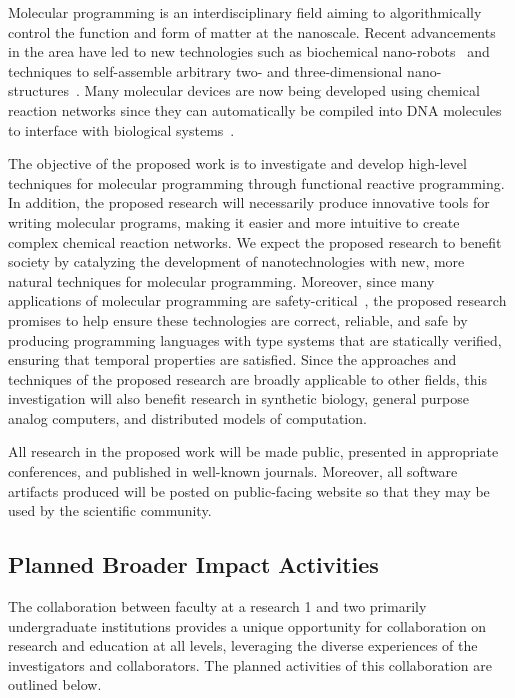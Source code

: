 

Molecular programming is an interdisciplinary field aiming to algorithmically control the function and form of matter at the nanoscale.
Recent advancements in the area have led to new technologies such as biochemical nano-robots~\cite{jDoBaCh12} and techniques to self-assemble arbitrary two- and three-dimensional nano-structures~\cite{jRoth06,jDDLHGS09,jDMTVCS09,jKOSY12,benson2015dna,Juneaav0655}.
Many molecular devices are now being developed using chemical reaction networks since they can automatically be compiled into DNA molecules to interface with biological systems~\cite{cSoSeWi09,jLYCP12,jCard13,jCDSPCS13,jSPSWS17,cBSJDTW17}.

The objective of the proposed work is to investigate and develop high-level techniques for molecular programming through functional reactive programming.
In addition, the proposed research will necessarily produce innovative tools for writing molecular programs, making it easier and more intuitive to create complex chemical reaction networks.
We expect the proposed research to benefit society by catalyzing the development of nanotechnologies with new, more natural techniques for molecular programming.
Moreover, since many applications of molecular programming are safety-critical~\cite{jEKLLLM17,cLutz18}, the proposed research promises to help ensure these technologies are correct, reliable, and safe by producing programming languages with type systems that are statically verified, ensuring that temporal properties are satisfied.
Since the approaches and techniques of the proposed research are broadly applicable to other fields, this investigation will also benefit research in synthetic biology, general purpose analog computers, and distributed models of computation.

All research in the proposed work will be made public, presented in appropriate conferences, and published in well-known journals.
Moreover, all software artifacts produced will be posted on public-facing website so that they may be used by the scientific community.


\subsection{Planned Broader Impact Activities}
The collaboration between faculty at a research 1 and two primarily undergraduate institutions provides a unique opportunity for collaboration on research and education at all levels, leveraging the diverse experiences of the investigators and collaborators.
The planned activities of this collaboration are outlined below.  

